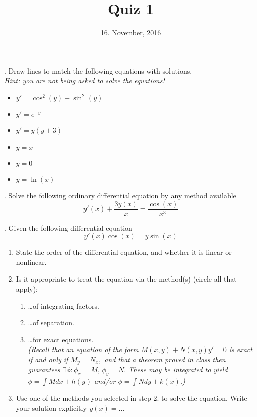 \documentclass[10pt,a4paper]{article}
\title{Quiz 1}
\date{16. November, 2016}
\begin{document}
\maketitle

. Draw lines to match the following equations with solutions. \\
\emph{Hint: you are not being asked to solve the equations!}
\begin{multicols}{2}
\begin{itemize}
\item $y' = \cos^2(y) + \sin^2(y)$ 
\item $y' = e^{-y}$
\item $y' = y(y+3)$
\item $ y = x$
\item $y = 0$
\item $ y = \ln(x)$
\end{itemize}
\end{multicols}



. Solve the following ordinary differential equation by any method available
\[ y'(x) + \frac{3y(x)}{x} = \frac{\cos(x)}{x^3} \]
\vspace{3em}

. Given the following differential equation 
\[ y'(x) \cos(x) = y \sin(x)  \]
\begin{enumerate}
\item State the order of the differential equation, and whether it is linear or nonlinear. \vspace{2em}
\item Is it appropriate to treat the equation via the method(s) (circle all that apply):
\begin{enumerate}
\item \ldots of integrating factors.
\item \ldots of separation.
\item \ldots for exact equations. \\
\emph{(Recall that an equation of the form $M(x,y) + N(x,y)y' = 0$ is exact if and only if $M_y = N_x,$ and that a theorem proved in class then guarantees $\exists \phi: \phi_x = M, \, \phi_y = N.$ These may be integrated to yield $\phi = \int M dx + h(y)$ and/or $\phi = \int N dy + k(x)$.)}
\end{enumerate}
\vspace{2em}
\item Use one of the methods you selected in step 2. to solve the equation.  Write your solution explicitly $y(x) = \ldots$
\end{enumerate}
\end{document}
